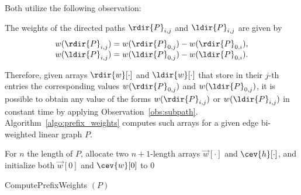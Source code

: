Both utilize the following observation:

\begin{observation}
	\label{obs:subpath}
	The weights of the directed paths $\rdir{P}_{i, j}$ and $\ldir{P}_{i, j}$ are given by 	
	$$ \begin{array}{l}
		w(\rdir{P}_{i, j}) = w(\rdir{P}_{0, j}) - w(\rdir{P}_{0, i}), \\	
		w(\ldir{P}_{i, j}) = w(\ldir{P}_{0, j}) - w(\ldir{P}_{0, i}).
	\end{array}	$$
\end{observation}

Therefore, given arrays $\rdir{w}[\cdot]$ and $\ldir{w}[\cdot]$ that store in their $j$-th entries the corresponding values $w(\rdir{P}_{0, j})$ and $w(\ldir{P}_{0, j})$, it is possible to obtain any value of the forms $w(\rdir{P}_{i, j})$ or $w(\ldir{P}_{i, j})$ in constant time by applying Observation~\ref{obs:subpath}. Algorithm~\ref{algo:prefix_weights} computes such arrays for a given edge bi-weighted linear graph $P$.	

\begin{algorithm}
	For $n$ the length of $P$, allocate two $n+1$-length arrays $\vec{w}[\cdot]$ and $\cev{h}[\cdot]$, and initialize both $\vec{w}[0]$ and $\cev{w}[0]$ to $0$\;
	\;
	\caption{ComputePrefixWeights $(P)$}
	\label{algo:prefix_weights}
\end{algorithm}

